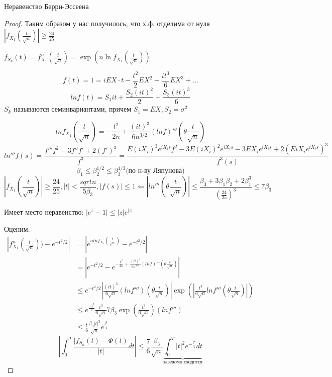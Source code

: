 \documentclass{article}
\begin{document}
\begin{theorem}{Неравенство Берри-Эссеена}
\begin{proof}
            Таким образом у нас получилось, что х.ф. отделима от нуля $|f_{X_1}(\frac{t}{\sqrt{n}})|\ge \frac{24}{25}$

            $f_{S_n} (t) = f_{X_1}^n (\frac{t}{\sqrt{n}}) = \exp(n \ln f_{X_1} (\frac{t}{\sqrt{n}}))$

            \begin{remark}
                $$f(t) = 1 = iEX\cdot t - \frac{t^2}{2} EX^2 - \frac{it^3}{6} EX^3 + \dots$$
                $$ ln f(t) = S_1it + \frac{S_2 (it)^2}{2} + \frac{S_3(it)^3}{6}$$
                $S_k$ называются семинвариантами, причем $S_1 = EX, S_2 = \sigma^2$
            \end{remark}
            $$ ln f_{X_1}(\frac{t}{\sqrt{n}}) = - \frac{t^2}{2n} + \frac{(it)^3}{6n^{3/2}}(ln f)''' (\theta \frac{t}{\sqrt{n}})$$
            $$ ln'''f(s) = \frac{f'''f^2 - 3f''f' + 2(f')^3}{f^3} = \frac{E(iX_i)^3 e^{iX_i s}f^2 - 3E(iX_i)^2e^{iX_is} - 3EX_i e^{iX_is} + 2(EiX_i e^{iX_is})^3}{f^3(s)}$$
            $$ \beta_1 \le \beta_2^{1/2} \le \beta_3^{1/3} \text{(по н-ву Ляпунова)}$$
            $$|f_{X_1}(\frac{t}{\sqrt{n}})|\ge \frac{24}{25}, |t| < \frac{sqrt{n}}{5\beta_3}, |f(s)| \le 1 \Leftarrow |ln'''(\theta \frac{t}{\sqrt{n}})| \le \frac{\beta_3 + 3 \beta_1\beta_2 + 2\beta_1^3}{(\frac{24}{25})^3} \le 7 \beta_3$$
            \begin{remark}
                Имеет место неравенство: $|e^z - 1|\le|z|e^{|z|}$
            \end{remark}
            Оценим:
             \begin{align*}
             \left|f_{X_1}^n (\frac{t}{\sqrt{n}})) -e ^{-t^2/2}\right| &= \left|e^{n lnf_{X_1}(\frac{t}{\sqrt{n}})} -e ^{-t^2/2}\right|\\ 
             &= \left|e ^{-t^2/2} - e^{- \frac{t^2}{2n} + \frac{(it)^3}{6n^{3/2}}(ln f)''' (\theta \frac{t}{\sqrt{n}})}\right|\\ 
             &\le e^{-t^2/2}\left|\frac{(it)^3}{6\sqrt{n}} (ln f''')(\theta \frac{t}{\sqrt{n}})\right| \exp\left(\left|\frac{t^3}{6\sqrt{n}} lnf'''(\theta \frac{t}{\sqrt{n}})\right|\right)\\ 
             &\le e^{\frac{-t^2}{2}} \frac{t^3}{6\sqrt{n}}7\beta_3 \exp\left(\frac{t^3}{6\sqrt{n}}\right) (ln f''')\\ 
             &\le \frac{t}{6} \frac{\beta_3 |t|^3}{\sqrt{n}} e^{\frac{t^2}{4}}
             \end{align*}
            $$
            \left|\int_0^T \frac{|f_{S_n}(t) - \Phi(t)}{|t|}dt\right| \le \frac{7}{6}\frac{\beta_3}{\sqrt{n}} \underbrace{\int_0^T {|t|}^2 e^{-\frac{t^2}{4}}dt}_{\text{заведомо сходится}}
            $$
       \end{proof}
   \end{theorem}
\end{document}

